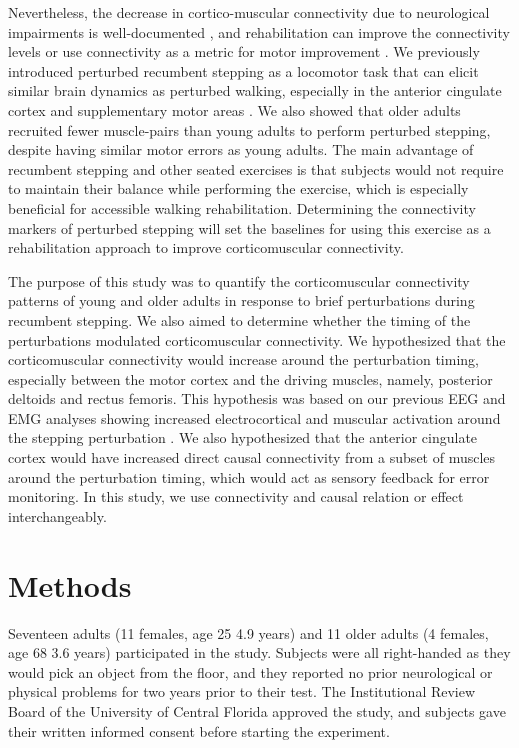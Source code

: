 \documentclass[../thesis_seyed.tex]{subfiles}
\begin{document}
Nevertheless, the decrease in cortico-muscular connectivity due to neurological impairments is well-documented \cite{Yokoyama2020-ie,Larsen2017-ya,Chen2018-ns}, and rehabilitation can improve the connectivity levels or use connectivity as a metric for motor improvement \cite{Youssofzadeh2016-sl,Chowdhury2020-qa}. We previously introduced perturbed recumbent stepping as a locomotor task that can elicit similar brain dynamics as perturbed walking, especially in the anterior cingulate cortex and supplementary motor areas \cite{Shirazi2021-ha}. We also showed that older adults recruited fewer muscle-pairs than young adults to perform perturbed stepping, despite having similar motor errors as young adults. The main advantage of recumbent stepping and other seated exercises is that subjects would not require to maintain their balance while performing the exercise, which is especially beneficial for accessible walking rehabilitation. Determining the connectivity markers of perturbed stepping will set the baselines for using this exercise as a rehabilitation approach to improve corticomuscular connectivity.

The purpose of this study was to quantify the corticomuscular connectivity patterns of young and older adults in response to brief perturbations during recumbent stepping. We also aimed to determine whether the timing of the perturbations modulated corticomuscular connectivity. We hypothesized that the corticomuscular connectivity would increase around the perturbation timing, especially between the motor cortex and the driving muscles, namely, posterior deltoids and rectus femoris. This hypothesis was based on our previous EEG and EMG analyses showing increased electrocortical and muscular activation around the stepping perturbation \cite{Shirazi2021-ha}. We also hypothesized that the anterior cingulate cortex would have increased direct causal connectivity from a subset of muscles around the perturbation timing, which would act as sensory feedback for error monitoring. In this study, we use connectivity and causal relation or effect interchangeably.

\section{Methods}

Seventeen adults (11 females, age 25  4.9 years) and 11 older adults (4 females, age 68  3.6 years) participated in the study. Subjects were all right-handed as they would pick an object from the floor, and they reported no prior neurological or physical problems for two years prior to their test.  The Institutional Review Board of the University of Central Florida approved the study, and subjects gave their written informed consent before starting the experiment.
\end{document}
